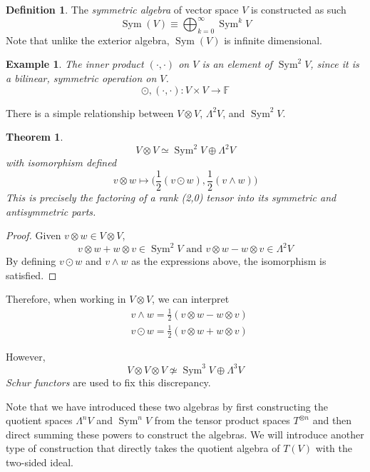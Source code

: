 \documentclass{article}
\DeclareMathOperator{\Sym}{Sym}
\newtheorem{theorem}{Theorem}[section]
\newtheorem{example}{Example}[section]
\theoremstyle{remark}
\theoremstyle{definition}
\newtheorem{definition}{Definition}[section]
\begin{document}
\begin{definition}
The \textit{symmetric algebra} of vector space $V$ is constructed as such 
\[\Sym (V) \equiv \bigoplus_{k=0}^\infty \Sym^k V\]
Note that unlike the exterior algebra, $\Sym(V)$ is infinite dimensional. 
\end{definition}

\begin{example}
The inner product $(\cdot, \cdot)$ on $V$ is an element of $\Sym^2 V$, since it is a bilinear, symmetric operation on $V$. 
\[\odot, (\cdot, \cdot): V \times V \longrightarrow \mathbb{F}\]
\end{example}

There is a simple relationship between $V \otimes V$, $\Lambda^2 V$, and $\Sym^2 V$. 

\begin{theorem}
\[V \otimes V \simeq \Sym^2 V \oplus \Lambda^2 V\]
with isomorphism defined
\[v \otimes w \mapsto \Big( \frac{1}{2} (v \odot w), \frac{1}{2} (v \wedge w) \Big)\]
This is precisely the factoring of a rank (2,0) tensor into its symmetric and antisymmetric parts. 
\end{theorem}
\begin{proof}
Given $v \otimes w \in V \otimes V$, 
\[v \otimes w + w \otimes v \in \Sym^2 V \text{ and } v \otimes w - w \otimes v \in \Lambda^2 V\]
By defining $v \odot w$ and $v \wedge w$ as the expressions above, the isomorphism is satisfied. 
\end{proof}

Therefore, when working in $V \otimes V$, we can interpret 
\begin{align*}
    & v \wedge w = \frac{1}{2} (v \otimes w - w \otimes v) \\
    & v \odot w = \frac{1}{2} (v \otimes w + w \otimes v) 
\end{align*}

However, 
\[V \otimes V \otimes V \not\simeq \Sym^3 V \oplus \Lambda^3 V\]
\textit{Schur functors} are used to fix this discrepancy. 

Note that we have introduced these two algebras by first constructing the quotient spaces $\Lambda^n V$ and $\Sym ^n V$ from the tensor product spaces $T^{\otimes n}$ and then direct summing these powers to construct the algebras. We will introduce another type of construction that directly takes the quotient algebra of $T(V)$ with the two-sided ideal. 
\end{document}
